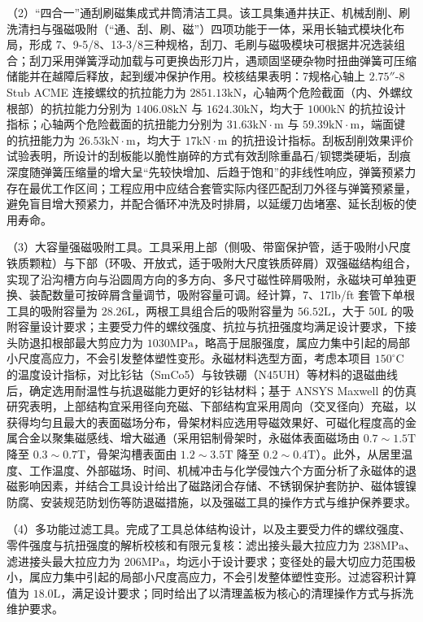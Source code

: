 （2）“四合一”通刮刷磁集成式井筒清洁工具。该工具集通井扶正、机械刮削、刷洗清扫与强磁吸附（“通、刮、刷、磁”）四项功能于一体，采用长轴式模块化布局，形成 7\inch、9-5/8\inch、13-3/8\inch 三种规格，刮刀、毛刷与磁吸模块可根据井况选装组合；刮刀采用弹簧浮动加载与可更换齿形刀片，遇顽固坚硬杂物时扭曲弹簧可压缩储能并在越障后释放，起到缓冲保护作用。校核结果表明：7\inch 规格心轴上 $2.75''\text{-}8$ Stub ACME 连接螺纹的抗拉能力为 $2851.13\mathrm{kN}$，心轴两个危险截面（内、外螺纹根部）的抗拉能力分别为 $1406.08\mathrm{kN}$ 与 $1624.30\mathrm{kN}$，均大于 $1000\mathrm{kN}$ 的抗拉设计指标；心轴两个危险截面的抗扭能力分别为 $31.63\mathrm{kN\cdot m}$ 与 $59.39\mathrm{kN\cdot m}$，端面键的抗扭能力为 $26.53\mathrm{kN\cdot m}$，均大于 $17\mathrm{kN\cdot m}$ 的抗扭设计指标。刮板刮削效果评价试验表明，所设计的刮板能以脆性崩碎的方式有效刮除重晶石/钡锶类硬垢，刮痕深度随弹簧压缩量的增大呈“先较快增加、后趋于饱和”的非线性响应，弹簧预紧力存在最优工作区间；工程应用中应结合套管实际内径匹配刮刀外径与弹簧预紧量，避免盲目增大预紧力，并配合循环冲洗及时排屑，以延缓刀齿堵塞、延长刮板的使用寿命。

（3）大容量强磁吸附工具。工具采用上部（侧吸、带窗保护管，适于吸附小尺度铁质颗粒）与下部（环吸、开放式，适于吸附大尺度铁质碎屑）双强磁结构组合，实现了沿沟槽方向与沿圆周方向的多方向、多尺寸磁性碎屑吸附，永磁块可单独更换、装配数量可按碎屑含量调节，吸附容量可调。经计算，7\inch、17lb/ft 套管下单根工具的吸附容量为 $28.26\mathrm{L}$，两根工具组合后的吸附容量为 $56.52\mathrm{L}$，大于 $50\mathrm{L}$ 的吸附容量设计要求；主要受力件的螺纹强度、抗拉与抗扭强度均满足设计要求，下接头防退扣根部最大剪应力为 $1030\mathrm{MPa}$，略高于屈服强度，属应力集中引起的局部小尺度高应力，不会引发整体塑性变形。永磁材料选型方面，考虑本项目 $150^\circ\mathrm{C}$ 的温度设计指标，对比钐钴（SmCo5）与钕铁硼（N45UH）等材料的退磁曲线后，确定选用耐温性与抗退磁能力更好的钐钴材料；基于 ANSYS Maxwell 的仿真研究表明，上部结构宜采用径向充磁、下部结构宜采用周向（交叉径向）充磁，以获得均匀且最大的表面磁场分布，骨架材料应选用导磁效果好、可磁化程度高的金属合金以聚集磁感线、增大磁通（采用铝制骨架时，永磁体表面磁场由 $0.7\sim1.5\mathrm{T}$ 降至 $0.3\sim0.7\mathrm{T}$，骨架沟槽表面由 $1.2\sim3.5\mathrm{T}$ 降至 $0.2\sim0.4\mathrm{T}$）。此外，从居里温度、工作温度、外部磁场、时间、机械冲击与化学侵蚀六个方面分析了永磁体的退磁影响因素，并结合工具设计给出了磁路闭合存储、不锈钢保护套防护、磁体镀镍防腐、安装规范防划伤等防退磁措施，以及强磁工具的操作方式与维护保养要求。

（4）多功能过滤工具。完成了工具总体结构设计，以及主要受力件的螺纹强度、零件强度与抗扭强度的解析校核和有限元复核：滤出接头最大拉应力为 $238\mathrm{MPa}$、滤进接头最大拉应力为 $206\mathrm{MPa}$，均远小于设计要求；变径处的最大切应力范围极小，属应力集中引起的局部小尺度高应力，不会引发整体塑性变形。过滤容积计算值为 $18.0\mathrm{L}$，满足设计要求；同时给出了以清理盖板为核心的清理操作方式与拆洗维护要求。

